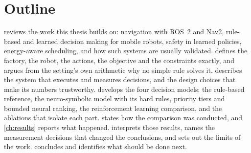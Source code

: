 \section{Outline}
\label{sec:outline}

 reviews the work this thesis builds on: navigation with ROS~2 and Nav2,
rule-based and learned decision making for mobile robots, safety in learned policies, energy-aware
scheduling, and how such systems are usually validated.  defines the factory, the
robot, the actions, the objective and the constraints exactly, and argues from the setting's own
arithmetic why no simple rule solves it.  describes the system that executes and
measures decisions, and the design choices that make its numbers trustworthy.
 develops the four decision models: the rule-based reference, the neuro-symbolic
model with its hard rules, priority tiers and bounded neural ranking, the reinforcement learning
comparison, and the ablations that isolate each part.  states how the comparison
was conducted, and \cref{ch:results} reports what happened.  interprets those
results, names the measurement decisions that changed the conclusions, and sets out the limits of
the work.  concludes and identifies what should be done next.
